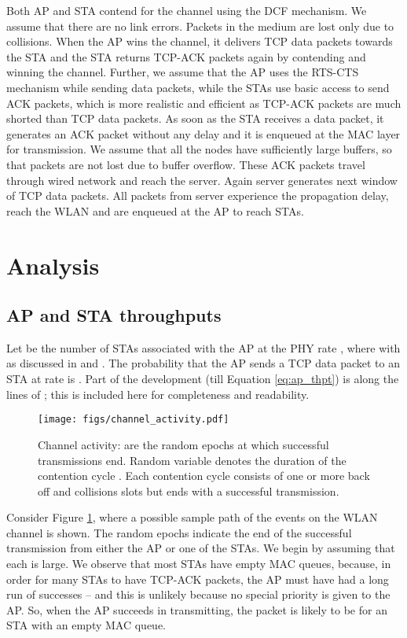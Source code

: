 \documentclass[conference]{IEEEtran}
\begin{document}
Both AP and STA contend for the channel using the DCF mechanism.
We assume that there are no link errors. Packets in the medium are 
lost only due to collisions. When the AP wins the channel, it delivers TCP
data packets towards the STA and the STA returns TCP-ACK packets again by
contending and winning the channel. Further, 
we assume that the AP uses the RTS-CTS mechanism while sending data packets, 
while the STAs use basic access to send ACK packets, which is more realistic 
and efficient as TCP-ACK packets are much shorted than TCP data packets. As 
soon as the STA receives a data packet, it generates an ACK packet without any 
delay and it is enqueued at the MAC layer for transmission. We assume that all 
the nodes have sufficiently large buffers, so that packets are not lost due to 
buffer overflow. These ACK packets travel through wired network and reach the 
server. Again server generates next window of TCP data packets. All packets 
from server experience the propagation delay, reach the WLAN and are enqueued 
at the AP to reach  STAs.
\section{Analysis}\label{sec:Analysis}
\subsection{AP and STA throughputs}
 Let  be the number of STAs associated with the AP at 
the PHY rate , where   with  as discussed in \cite{astn_model:Krusheel} and \cite
{astn_model:pradeep_kuri}. The probability that the AP sends a TCP data packet 
to an STA at rate  is . Part of the development (till 
Equation \eqref{eq:ap_thpt}) is along the lines of \cite
{astn_model:pradeep_kuri}; this is included here for completeness and readability.
\begin{figure}[h]
\centering
\texttt{[image: figs/channel\_activity.pdf]} 
\caption{ Channel activity:  are the random epochs at which successful 
transmissions end. Random variable  denotes the duration of the  
contention cycle . Each contention cycle consists of one or 
more back off and collisions slots but ends with a successful transmission. }
\label{fig:channel_activity}
\end{figure}
Consider Figure \ref{fig:channel_activity}, where a possible sample path of the 
events on the WLAN channel is shown. The random epochs  indicate the end 
of the  successful transmission from either the AP or one of the 
STAs. We begin by assuming that each  is large. We observe that most 
STAs have empty MAC queues, because, in order for many STAs to have TCP-ACK 
packets, the AP must have had a long run of successes -- and this is unlikely 
because no special priority is given to the AP. So, when the AP succeeds in 
transmitting, the packet is likely to be for an STA with an empty MAC queue.
\end{document}
